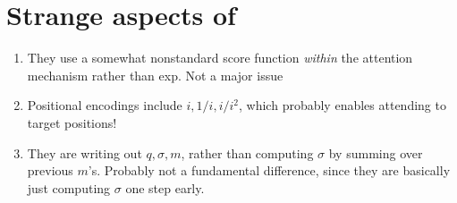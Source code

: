 \section{Strange aspects of \citet{perez2021attention}}

\begin{enumerate}
    \item They use a somewhat nonstandard score function \emph{within} the attention mechanism rather than exp. Not a major issue
    \item Positional encodings include $i, 1/i, i/i^2$, which probably enables attending to target positions! 
    \item They are writing out $q, \sigma, m$, rather than computing $\sigma$ by summing over previous $m$'s. Probably not a fundamental difference, since they are basically just computing $\sigma$ one step early.
\end{enumerate}